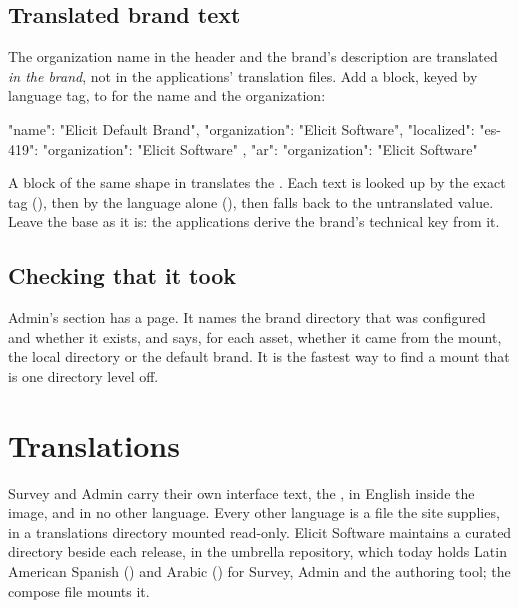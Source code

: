 \documentclass[11pt, a4paper]{article}
\begin{document}
\subsection{Translated brand text}

The organization name in the header and the brand's description are translated \emph{in the
brand}, not in the applications' translation files. Add a  block, keyed by
language tag, to  for the name and the organization:

\begin{elicitfile}
{
  "name": "Elicit Default Brand",
  "organization": "Elicit Software",
  "localized": {
    "es-419": { "organization": "Elicit Software" },
    "ar":     { "organization": "Elicit Software" }
  }
}
\end{elicitfile}

A block of the same shape in  translates the . Each text
is looked up by the exact tag (), then by the language alone (), then falls
back to the untranslated value. Leave the base  as it is: the applications derive
the brand's technical key from it.

\subsection{Checking that it took}

Admin's  section has a  page. It names the brand directory that was
configured and whether it exists, and says, for each asset, whether it came from the mount, the
local directory or the default brand. It is the fastest way to find a mount that is one
directory level off.


\section{Translations}
\label{sec:i18n}

Survey and Admin carry their own interface text, the , in English inside the
image, and in no other language. Every other language is a file the site supplies, in a
translations directory mounted read-only. Elicit Software maintains a curated directory beside
each release,  in the umbrella repository, which today holds Latin American
Spanish () and Arabic () for Survey, Admin and the authoring tool; the
compose file mounts it.
\end{document}

